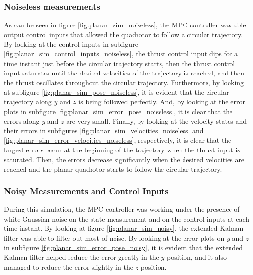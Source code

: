 \documentclass{thesisreport}
\begin{document}
\subsubsection*{Noiseless measurements}

As can be seen in figure \ref{fig:planar_sim_noiseless}, the MPC controller was able output control inputs that allowed the quadrotor to follow a circular trajectory. By looking at the control inputs in subfigure \ref{fig:planar_sim_control_inputs_noiseless}, the thrust control input dips for a time instant just before the circular trajectory starts, then the thrust control input saturates until the desired velocities of the trajectory is reached, and then the thrust oscillates throughout the circular trajectory. Furthermore, by looking at subfigure \ref{fig:planar_sim_pose_noiseless}, it is evident that the circular trajectory along $y$ and $z$ is being followed perfectly. And, by looking at the error plots in subfigure \ref{fig:planar_sim_error_pose_noiseless}, it is clear that the errors along $y$ and $z$ are very small. Finally, by looking at the velocity states and their errors in subfigures \ref{fig:planar_sim_velocities_noiseless} and \ref{fig:planar_sim_error_velocities_noiseless}, respectively, it is clear that the largest errors occur at the beginning of the trajectory when the thrust input is saturated. Then, the errors decrease significantly when the desired velocities are reached and the planar quadrotor starts to follow the circular trajectory.

\subsubsection*{Noisy Measurements and Control Inputs}

During this simulation, the MPC controller was working under the presence of white Gaussian noise on the state measurement and on the control inputs at each time instant. By looking at figure \ref{fig:planar_sim_noisy}, the extended Kalman filter was able to filter out most of noise. By looking at the error plots on $y$ and $z$ in subfigure \ref{fig:planar_sim_error_pose_noisy}, it is evident that the extended Kalman filter helped reduce the error greatly in the $y$ position, and it also managed to reduce the error slightly in the $z$ position.

\newpage
\end{document}
